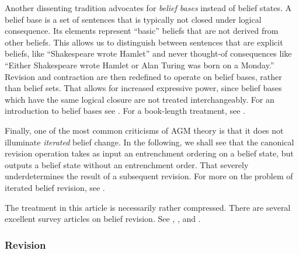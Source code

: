 Another dissenting tradition advocates for {\em belief bases} instead of belief
states. A belief base is a set of sentences that is typically not closed under
logical consequence. Its elements represent ``basic'' beliefs that are not
derived from other beliefs. This allows us to distinguish between sentences that
are explicit beliefs, like ``Shakespeare wrote Hamlet'' and never thought-of
consequences like ``Either Shakespeare wrote Hamlet or Alan Turing was born on a
Monday.''  Revision and contraction are then redefined to operate on belief
bases, rather than belief sets. That allows for increased expressive power,
since belief bases which have the same logical closure are not treated
interchangeably. For an introduction to belief bases see
\citet{sep-logic-belief-revision}. For a book-length treatment, see
\citet{hansson1999dynamics}.

Finally, one of the most common criticisms of AGM theory is that it does not
illuminate {\em iterated} belief change. In the following, we shall see that the
canonical revision operation takes as input an entrenchment ordering on a belief
state, but outputs a belief state without an entrenchment order. That severely
underdetermines the result of a subsequent revision. For more on the problem of
iterated belief revision, see \citet{huber2013belief}.

The treatment in this article is necessarily rather compressed. There are
several excellent survey articles on belief revision. See
\citet{sep-logic-belief-revision}, \citet{huber2013belief, huber2013ranking},
and \citet{lin2019belief}.


\subsubsection{Revision}
\label{AGMrevision}

